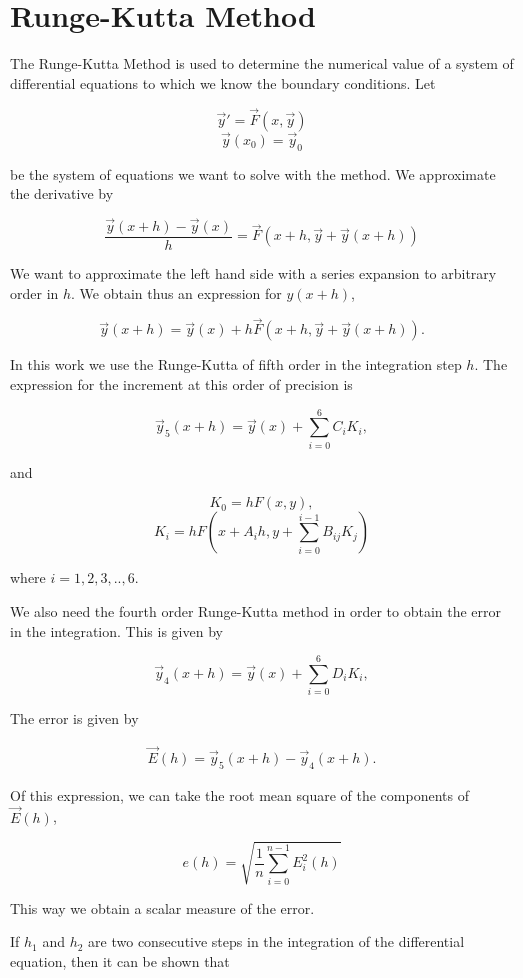 \section{Runge-Kutta Method}
\label{sec:run_kut}

The Runge-Kutta Method is used to determine the numerical value of a system of differential equations to which we know the boundary conditions. Let 

$$\vec{y}' = \vec{F}(x, \vec{y})$$
$$\vec{y}(x_0) = \vec{y}_0$$

be the system of equations we want to solve with the method. We approximate the derivative by

$$\frac{\vec{y}(x+h)-\vec{y}(x)}{h} = \vec{F}(x + h, \vec{y}+\vec{y}(x+h))$$

We want to approximate the left hand side with a series expansion to arbitrary order in $h$. We obtain thus an expression for $y(x+h)$,

$$\vec{y}(x+h)=\vec{y}(x)+ h\vec{F}(x + h, \vec{y}+\vec{y}(x+h)).$$

In this work we use the Runge-Kutta of fifth order in the integration step $h$. The expression for the increment at this order of precision is

$$\vec{y}_5(x+h) = \vec{y}(x) + \sum_{i=0}^{6} C_{i} K_i,$$

and

$$K_0 = hF(x,y),$$
$$K_i = hF(x+A_ih,y+\sum_{i=0}^{i-1} B_{ij} K_j)$$

where $i = 1,2,3, .. , 6 $.

We also need the fourth order Runge-Kutta method in order to obtain the error in the integration. This is given by

$$\vec{y}_4(x+h) = \vec{y}(x) + \sum_{i=0}^{6} D_{i} K_i,$$

The error is given by 

\begin{eqnarray}
\vec{E}(h) = \vec{y}_5(x+h) - \vec{y}_4(x+h).
\end{eqnarray}

Of this expression, we can take the root mean square of the components of $\vec{E}(h)$,

\begin{equation}
e(h) = \sqrt{\frac{1}{n}\sum_{i=0}^{n-1}E_i^2(h)}
\end{equation}

This way we obtain a scalar measure of the error.

If $h_1$ and $h_2$ are two consecutive steps in the integration of the differential equation, then it can be shown that


